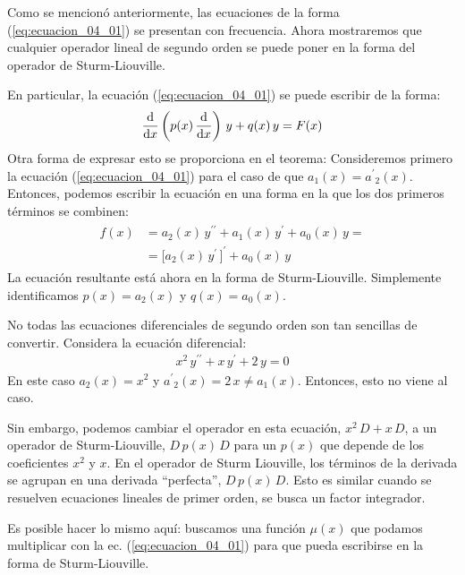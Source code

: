\documentclass[12pt]{article}
\newcommand{\pderivada}[1]{\ensuremath{{#1}^{\prime}}}
\newcommand{\sderivada}[1]{\ensuremath{{#1}^{\prime \prime}}}
\numberwithin{equation}{section}
\begin{document}
Como se mencionó anteriormente, las ecuaciones de la forma (\ref{eq:ecuacion_04_01}) se presentan con frecuencia. Ahora mostraremos que cualquier operador lineal de segundo orden se puede poner en la forma del operador de Sturm-Liouville.
\par
En particular, la ecuación (\ref{eq:ecuacion_04_01}) se puede escribir de la forma:
\begin{align}
\dv{x} \left( p(x) \, \dv{x} \right) \, y + q(x) \, y =  F(x)
\label{eq:ecuacion_04_05}
\end{align}
Otra forma de expresar esto se proporciona en el teorema:  Consideremos primero la ecuación (\ref{eq:ecuacion_04_01}) para el caso de que $a_{1} (x) = \pderivada{a}_{2} (x)$. Entonces, podemos escribir la ecuación en una forma en la que los dos primeros términos se combinen:
\begin{align}
\begin{aligned}
f (x) &= a_{2} (x) \, \sderivada{y} + a_{1} (x) \, \pderivada{y} + a_{0} (x) \, y = \\[0.5em]
&= \big[ a_{2} (x) \, \pderivada{y} \, \big]^{\prime} + a_{0} (x) \, y
\end{aligned}
\label{eq:ecuacion_04_06}
\end{align}
La ecuación resultante está ahora en la forma de Sturm-Liouville. Simplemente identificamos $p(x) = a_{2} (x)$ y $q (x) = a_{0} (x)$.
\par
No todas las ecuaciones diferenciales de segundo orden son tan sencillas de convertir. Considera la ecuación diferencial:
\begin{align*}
x^{2} \, \sderivada{y} + x \, \pderivada{y} + 2 \, y = 0
\end{align*}
En este caso $a_{2} (x) = x^{2}$ y $\pderivada{a}_{2} (x) = 2 \, x \neq a_{1} (x)$.  Entonces, esto no viene al caso.
\par
Sin embargo, podemos cambiar el operador en esta ecuación, $x^{2} \, D + x \, D$, a un operador de Sturm-Liouville, $D \, p (x) \, D$ para un $p (x)$ que depende de los coeficientes $x^{2}$ y $x$. En el operador de Sturm Liouville, los términos de la derivada se agrupan en una derivada \enquote{perfecta}, $D \, p (x) \, D$. Esto es similar cuando se resuelven ecuaciones lineales de primer orden, se busca un factor integrador.
\par
Es posible hacer lo mismo aquí: buscamos una función $\mu (x)$ que podamos multiplicar con la ec. (\ref{eq:ecuacion_04_01}) para que pueda escribirse en la forma de Sturm-Liouville.
\end{document}
